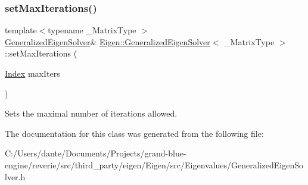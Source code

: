 \subsubsection{\texorpdfstring{setMaxIterations()}{setMaxIterations()}}
{\footnotesize\ttfamily template$<$typename \+\_\+\+Matrix\+Type $>$ \\
\mbox{\hyperlink{class_eigen_1_1_generalized_eigen_solver}{Generalized\+Eigen\+Solver}}\& \mbox{\hyperlink{class_eigen_1_1_generalized_eigen_solver}{Eigen\+::\+Generalized\+Eigen\+Solver}}$<$ \+\_\+\+Matrix\+Type $>$\+::set\+Max\+Iterations (\begin{DoxyParamCaption}\item[{\mbox{\hyperlink{class_eigen_1_1_generalized_eigen_solver_a46a0ff3841059479ec314e56a5645302}{Index}}}]{max\+Iters }\end{DoxyParamCaption})\hspace{0.3cm}{\ttfamily [inline]}}

Sets the maximal number of iterations allowed. 

The documentation for this class was generated from the following file\+:\begin{DoxyCompactItemize}
\item 
C\+:/\+Users/dante/\+Documents/\+Projects/grand-\/blue-\/engine/reverie/src/third\+\_\+party/eigen/\+Eigen/src/\+Eigenvalues/Generalized\+Eigen\+Solver.\+h\end{DoxyCompactItemize}

